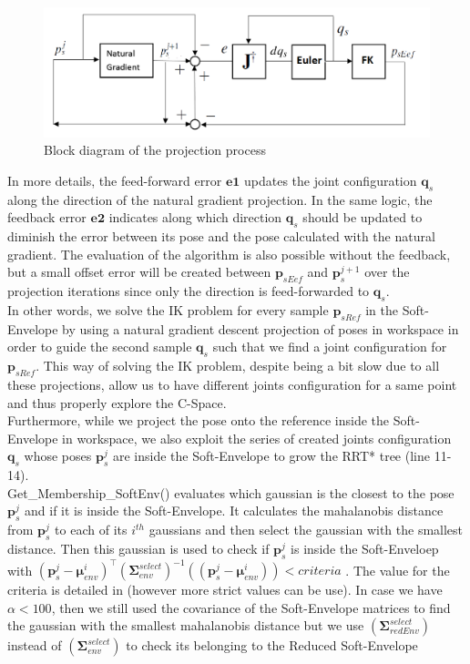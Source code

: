 \documentclass[letterpaper, 10 pt, conference]{ieeeconf}  %
\newcommand{\trsp}{{\!\scriptscriptstyle\top}}
\newcommand{\mb}[1]{{\boldsymbol{#1}}}
\begin{document}
\begin{figure}[h]
	\centering
	\includegraphics[scale=0.35]{figure/loopControl.png}
	\caption{Block diagram of the projection process}
	\label{loopControl}
\end{figure}

In more details, the feed-forward error $\mb{e1}$ updates the joint configuration $\mb{q}_s$ along the direction of the natural gradient projection. In the same logic, the feedback error $\mb{e2}$ indicates along which direction $\mb{q}_s$ should be updated to diminish the error between its pose and the pose calculated with the natural gradient. The evaluation of the algorithm is also possible without the feedback, but a small offset error will be created between $\mb{p}_{sEef}$ and $\mb{p}_s^{j+1}$ over the projection iterations since only the direction is feed-forwarded to $\mb{q}_s$. \\
 In other words, we solve the IK problem for every sample  $\mb{p}_{sRef}$ in the Soft-Envelope by using a natural gradient descent projection of poses in workspace in order to guide the second sample $\mb{q}_s$ such that we find a joint configuration for $\mb{p}_{sRef}$. This way of solving the IK problem, despite being a bit slow due to all these projections, allow us to have different joints configuration for a same point and thus properly explore the C-Space.\\
Furthermore, while we project the pose onto the reference inside the Soft-Envelope in workspace, we also exploit the series of created joints configuration $\mb{q}_s$ whose poses $\mb{p}_s^j$ are inside the Soft-Envelope to grow the RRT* tree (line 11-14).\\
{\selectfont Get\_Membership\_SoftEnv()} evaluates which gaussian is the closest to the pose $\mb{p}_s^j$ and if it is inside the Soft-Envelope. It calculates the mahalanobis distance from $\mb{p}_s^j$  to each of its $i^{th}$ gaussians and then select the gaussian with the smallest distance. Then this gaussian is used to check if $\mb{p}_s^j$ is inside the Soft-Enveloep with $(\mb{p}_s^j-\mb{\mu}_{env}^i)^{\trsp}(\mb{\Sigma}_{env}^{select})^{-1} ((\mb{p}_s^j-\mb{\mu}_{env}^i)) < criteria$ . The value for the criteria is detailed in \cite{Filzmoser04amultivariate} (however more strict values can be use). In case we have $\alpha<100$, then we still used the covariance of the Soft-Envelope matrices to find the gaussian with the smallest mahalanobis distance but we use $(\mb{\Sigma}_{redEnv}^{select})$ instead of $(\mb{\Sigma}_{env}^{select})$ to check its belonging to the Reduced Soft-Envelope\\
\end{document}
